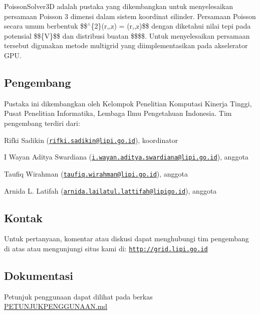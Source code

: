 Poisson\+Solver3D adalah pustaka yang dikembangkan untuk menyelesaikan persamaan Poisson 3 dimensi dalam sistem koordinat silinder. Persamaan Poisson secara umum berbentuk \$\$$^\wedge$\{2\}(r,,z) = (r,,z)\$\$ dengan diketahui nilai tepi pada potensial \$\$\{V\}\$\$ dan distribusi buatan \$\$\$\$. Untuk menyelesaikan persamaan tersebut digunakan metode multigrid yang diimplementasikan pada akselerator G\+PU.

\subsection*{Pengembang}

Pustaka ini dikembangkan oleh Kelompok Penelitian Komputasi Kinerja Tinggi, Pusat Penelitian Informatika, Lembaga Ilmu Pengetahuan Indonesia. Tim pengembang terdiri dari\+:


\begin{DoxyItemize}
\item Rifki Sadikin (\href{mailto:rifki.sadikin@lipi.go.id}{\tt rifki.\+sadikin@lipi.\+go.\+id}), koordinator
\item I Wayan Aditya Swardiana (\href{mailto:i.wayan.aditya.swardiana@lipi.go.id}{\tt i.\+wayan.\+aditya.\+swardiana@lipi.\+go.\+id}), anggota
\item Taufiq Wirahman (\href{mailto:taufiq.wirahman@lipi.go.id}{\tt taufiq.\+wirahman@lipi.\+go.\+id}), anggota
\item Arnida L. Latifah (\href{mailto:arnida.lailatul.lattifah@lipigo.id}{\tt arnida.\+lailatul.\+lattifah@lipigo.\+id}), anggota \subsection*{Kontak}
\end{DoxyItemize}

Untuk pertanyaan, komentar atau diskusi dapat menghubungi tim pengembang di atas atau mengunjungi situs kami di\+: \href{http://grid.lipi.go.id}{\tt http\+://grid.\+lipi.\+go.\+id}

\subsection*{Dokumentasi}

Petunjuk penggunaan dapat dilihat pada berkas \hyperlink{PETUNJUKPENGGUNAAN_8md_source}{P\+E\+T\+U\+N\+J\+U\+K\+P\+E\+N\+G\+G\+U\+N\+A\+AN.md} 